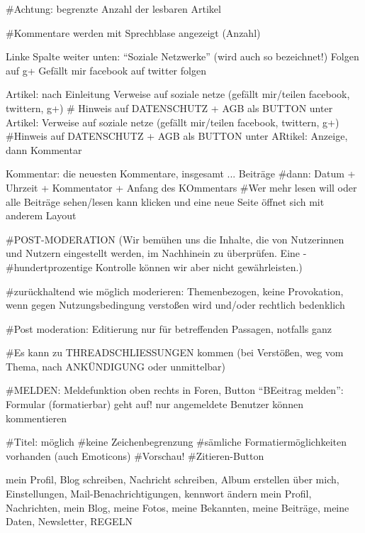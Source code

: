 #Achtung: begrenzte Anzahl der lesbaren Artikel

#Kommentare werden mit Sprechblase angezeigt (Anzahl)

Linke Spalte weiter unten: ``Soziale Netzwerke'' (wird auch so bezeichnet!)
Folgen auf g+
Gefällt mir facebook
auf twitter folgen 

Artikel: nach Einleitung Verweise auf soziale netze (gefällt mir/teilen facebook, twittern, g+) 
# Hinweis auf DATENSCHUTZ + AGB als BUTTON
unter Artikel: Verweise auf soziale netze (gefällt mir/teilen facebook, twittern, g+) 
#Hinweis auf DATENSCHUTZ + AGB als BUTTON
unter ARtikel: Anzeige, dann Kommentar

Kommentar: die neuesten Kommentare, insgesamt ... Beiträge
#dann: Datum + Uhrzeit + Kommentator + Anfang des KOmmentars
#Wer mehr lesen will oder alle Beiträge sehen/lesen kann klicken und eine neue Seite öffnet sich mit anderem Layout

#POST-MODERATION (Wir bemühen uns die Inhalte, die von Nutzerinnen und Nutzern eingestellt werden, im Nachhinein zu überprüfen. Eine -#hundertprozentige Kontrolle können wir aber nicht gewährleisten.)

#zurückhaltend wie möglich moderieren: Themenbezogen, keine Provokation, wenn gegen Nutzungsbedingung verstoßen wird und/oder rechtlich bedenklich

#Post moderation: Editierung nur für betreffenden Passagen, notfalls ganz

#Es kann zu THREADSCHLIESSUNGEN kommen (bei Verstößen, weg vom Thema, nach ANKÜNDIGUNG oder unmittelbar)

#MELDEN: Meldefunktion oben rechts in Foren, Button ``BEeitrag melden'': Formular (formatierbar) geht auf! nur angemeldete Benutzer können kommentieren

#Titel: möglich
#keine Zeichenbegrenzung
#sämliche Formatiermöglichkeiten vorhanden (auch Emoticons)
#Vorschau!
#Zitieren-Button


mein Profil, Blog schreiben, Nachricht schreiben, Album erstellen 
über mich, Einstellungen, Mail-Benachrichtigungen, kennwort ändern
mein Profil, Nachrichten, mein Blog, meine Fotos, meine Bekannten, meine Beiträge, meine Daten, Newsletter, REGELN

